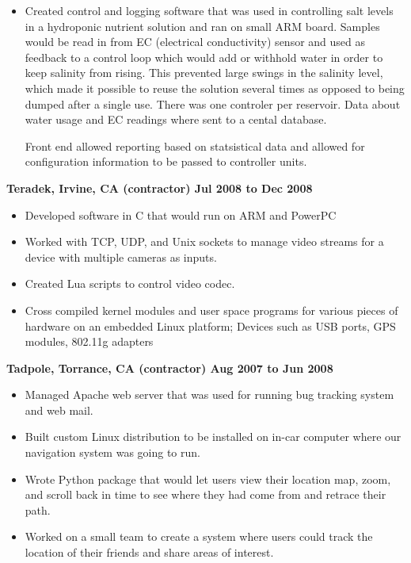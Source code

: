 \documentclass{res}
\begin{document}
\begin{resume}
\begin{itemize}
\item Created control and logging software that was used in controlling
salt levels in a hydroponic nutrient solution and ran on small ARM board.
Samples would be read
in from EC (electrical conductivity) sensor and used as feedback
to a control loop
which would add or withhold water in order to keep salinity from rising.
This prevented large swings in the salinity level, which made it possible
to reuse the solution several times as opposed to being dumped after a
single use.  There was one controler per reservoir.  Data about water
usage and EC readings where sent to a cental database.

\items Front end allowed reporting based on statsistical data and allowed
for configuration information to be passed to controller units.

\end{itemize}

{\large \bf Teradek, Irvine, CA (contractor) \hfill Jul 2008 to Dec 2008}
\begin{itemize}
\item Developed software in C that would run on ARM and PowerPC
\item Worked with TCP, UDP, and Unix sockets to manage video streams for
a device with multiple cameras as inputs.
\item Created Lua scripts to control video codec.
\item Cross compiled kernel modules and user space programs for various
pieces of hardware on an embedded Linux platform; Devices such as USB
ports, GPS modules, 802.11g adapters
\end{itemize}

{\large \bf Tadpole, Torrance, CA (contractor) \hfill Aug 2007 to Jun 2008}
\begin{itemize}

\item Managed Apache web server that was used for running bug
tracking system and web mail.

\item Built custom Linux distribution to be installed on in-car
computer where our navigation system was going to run.

\item Wrote Python package that would let users view their location
map, zoom, and scroll back in time to see where they had come from
and retrace their path.

\item Worked on a small team to create a system where users could
track the location of their friends and share areas of interest.


\end{itemize}
\end{resume}
\end{document}
